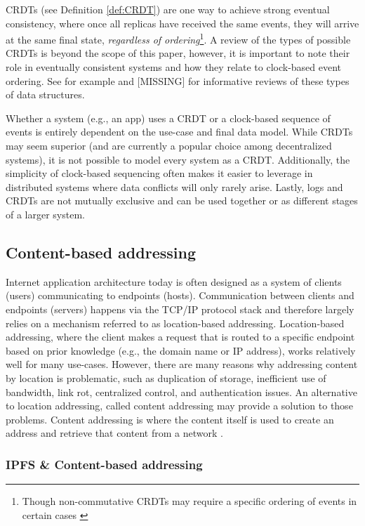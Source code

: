 \documentclass{textile}
\begin{document}
CRDTs (see Definition \ref{def:CRDT}) are one way to achieve strong eventual consistency, where once all replicas have received the same events, they will arrive at the same final state, \emph{regardless of ordering}\footnote{Though non-commutative CRDTs may require a specific ordering of events in certain cases \cite{sanjuanMerkleCRDTs2019}}. A review of the types of possible CRDTs is beyond the scope of this paper, however, it is important to note their role in eventually consistent systems and how they relate to clock-based event ordering. See for example \cite{sanjuanMerkleCRDTs2019} and [MISSING] for informative reviews of these types of data structures.

Whether a system (e.g., an app) uses a CRDT or a clock-based sequence of events is entirely dependent on the use-case and final data model. While CRDTs may seem superior (and are currently a popular choice among decentralized systems), it is not possible to model every system as a CRDT. Additionally, the simplicity of clock-based sequencing often makes it easier to leverage in distributed systems where data conflicts will only rarely arise. Lastly, logs and CRDTs are not mutually exclusive and can be used together or as different stages of a larger system.

\subsection{Content-based addressing}

Internet application architecture today is often designed as a system of clients (users) communicating to endpoints (hosts). Communication between clients and endpoints (servers) happens via the TCP/IP protocol stack and therefore largely relies on a mechanism referred to as location-based addressing. Location-based addressing, where the client makes a request that is routed to a specific endpoint based on prior knowledge (e.g., the domain name or IP address), works relatively well for many use-cases. However, there are many reasons why addressing content by location is problematic, such as duplication of storage, inefficient use of bandwidth, link rot, centralized control, and authentication issues. An alternative to location addressing, called content addressing may provide a solution to those problems. Content addressing is where the content itself is used to create an address and retrieve that content from a network \cite{mortContentBasedAddressing2012}.

\subsubsection{IPFS \& Content-based addressing}
\end{document}
